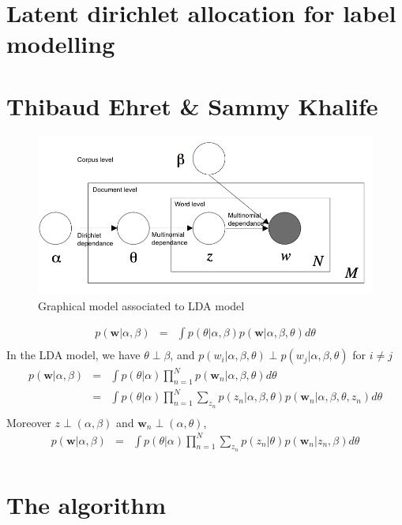 \documentclass[12pt]{article}
\begin{document}
\section*{Latent dirichlet allocation for label modelling}
\section*{Thibaud Ehret \& Sammy Khalife}
\begin{figure}[!h]
\centering
\captionsetup{justification=centering,margin=2cm}
\includegraphics[width=15cm]{LDA.png}
\caption{Graphical model associated to LDA model}
\end{figure}


\begin{eqnarray*}
p(\textbf{w}|\alpha, \beta) &  = & \int p(\theta | \alpha, \beta)p(\textbf{w} | \alpha, \beta, \theta)d\theta\\
\end{eqnarray*}
In the LDA model, we have $ \theta \perp \beta$, and $p(w_{i} | \alpha, \beta, \theta) \perp p(w_{j} | \alpha, \beta, \theta)$  for $ i \neq j $
\begin{eqnarray*}
p(\textbf{w}|\alpha, \beta) & = & \int p(\theta | \alpha) \prod_{n=1}^{N} p(\textbf{w}_{n} | \alpha, \beta, \theta)d\theta\\
& = & \int  p(\theta |\alpha) \prod_{n=1}^{N}  \sum_{z_{n}}p(z_{n}|\alpha, \beta, \theta)p(\textbf{w}_{n} | \alpha, \beta, \theta, z_{n}) d\theta\\
\end{eqnarray*}
Moreover $z \perp (\alpha,\beta)$ and $\textbf{w}_{n} \perp (\alpha,\theta)$,
\begin{eqnarray*}
p(\textbf{w}|\alpha, \beta) & = & \int p(\theta | \alpha)  \prod_{n=1}^{N}  \sum_{z_{n}}p(z_{n} |\theta)p(\textbf{w}_{n} | z_{n}, \beta) d\theta\\
\end{eqnarray*}









\section{The algorithm}

\end{document}
